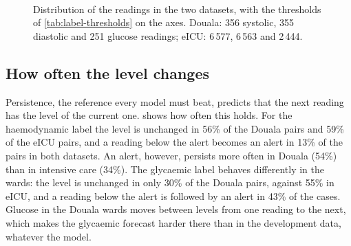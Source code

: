 \documentclass[11pt,a4paper,oneside]{report}
\begin{document}
\begin{figure}[htbp]
\centering
{}\\[2pt]
\caption{Distribution of the readings in the two datasets, with the thresholds of \cref{tab:label-thresholds} on the axes. Douala: 356 systolic, 355 diastolic and 251 glucose readings; eICU: 6\,577, 6\,563 and 2\,444.}\label{fig:values}
\end{figure}

\subsection{How often the level changes}\label{sec:results-transitions}

Persistence, the reference every model must beat, predicts that the next reading has the level of the current one.  shows how often this holds. For the haemodynamic label the level is unchanged in 56\% of the Douala pairs and 59\% of the eICU pairs, and a reading below the alert becomes an alert in 13\% of the pairs in both datasets. An alert, however, persists more often in Douala (54\%) than in intensive care (34\%). The glycaemic label behaves differently in the wards: the level is unchanged in only 30\% of the Douala pairs, against 55\% in eICU, and a reading below the alert is followed by an alert in 43\% of the cases. Glucose in the Douala wards moves between levels from one reading to the next, which makes the glycaemic forecast harder there than in the development data, whatever the model.
\end{document}

